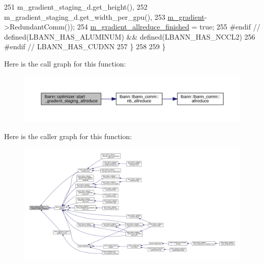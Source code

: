 \begin{DoxyCode}
251                                       m\_gradient\_staging\_d.get\_height(),
252                                       m\_gradient\_staging\_d.get\_width\_per\_gpu(),
253                                       \hyperlink{classlbann_1_1optimizer_a3df20cb0ae2b60430ad4fd235d66c12e}{m\_gradient}->RedundantComm());
254     \hyperlink{classlbann_1_1optimizer_a4d332551d05e245ad3f862653b5af65a}{m\_gradient\_allreduce\_finished} = \textcolor{keyword}{true};
255 \textcolor{preprocessor}{    #endif // defined(LBANN\_HAS\_ALUMINUM) && defined(LBANN\_HAS\_NCCL2)}
256 \textcolor{preprocessor}{    #endif // LBANN\_HAS\_CUDNN}
257   \}
258 
259 \}
\end{DoxyCode}
Here is the call graph for this function\+:\nopagebreak
\begin{figure}[H]
\begin{center}
\leavevmode
\includegraphics[width=350pt]{classlbann_1_1optimizer_a1fe495ccbd62d50735615818abecf454_cgraph}
\end{center}
\end{figure}
Here is the caller graph for this function\+:\nopagebreak
\begin{figure}[H]
\begin{center}
\leavevmode
\includegraphics[width=350pt]{classlbann_1_1optimizer_a1fe495ccbd62d50735615818abecf454_icgraph}
\end{center}
\end{figure}
\mbox{\label{classlbann_1_1optimizer_aa9f43ca3f22edc0a25d0509b6514a411}} 
